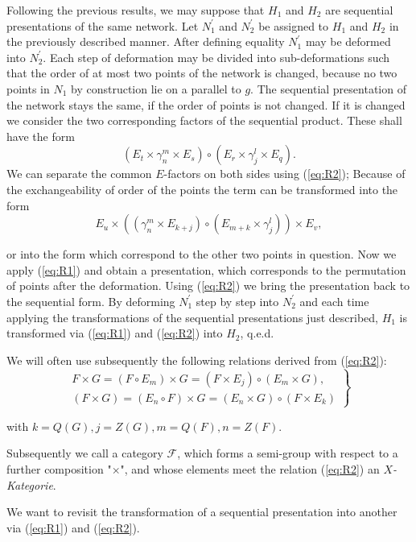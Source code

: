 \documentclass{article}
\begin{document}
Following the previous results, we may suppose that $H_1$ and $H_2$ are sequential presentations of the same network. Let $N_1^{\prime}$ and $N_2^{\prime}$ be assigned to $H_1$ and $H_2$ in the previously described manner. After defining equality $N_1^{\prime}$ may be deformed into $N_2^{\prime}$. Each step of deformation may be divided into sub-deformations such that the order of at most two points of the network is changed, because no two points in $N_1$ by construction lie on a parallel to $g$. The sequential
presentation of the network stays the same, if the order of points is not changed. If it is changed we consider the two corresponding factors of the sequential product. These shall have the form
\[
(E_t \times \gamma_n^m \times E_s) \circ (E_r \times \gamma_j^l \times E_q).
\]
We can separate the common $E$-factors on both sides using (\ref{eq:R2}); Because of the exchangeability of order of the points the term can be transformed into the form
\[
  E_u \times ((\gamma_n^m \times E_{k+j}) \circ (E_{m+k} \times \gamma_j^l)) \times E_v,
\]

or into the form which correspond to the other two points in question. Now we apply (\ref{eq:R1}) and obtain a presentation, which corresponds to the permutation of points after the deformation. Using (\ref{eq:R2}) we bring the presentation back to the sequential form. By deforming $N_1^{\prime}$ step by step into $N_2^{\prime}$ and each time applying the transformations of the sequential presentations just described, $H_1$ is transformed via (\ref{eq:R1}) and (\ref{eq:R2}) into $H_2$, q.e.d.

We will often use subsequently the following relations derived from (\ref{eq:R2}):
\begin{equation}
\label{eq:R2prime}
\tag{R2\'}
\left.
  \begin{array}{c}
  F \times G = (F \circ E_m) \times G = (F\times E_j) \circ (E_m \times G), \\
    (F \times G) = (E_n \circ F) \times G = (E_n \times G) \circ (F \times E_k)
\end{array}
\right\}
\end{equation}

with $k = Q(G), j = Z(G), m = Q(F), n = Z(F)$.

Subsequently we call a category $\mathcal{F}$, which forms a semi-group with respect to a further composition "$\times$", and whose elements meet the relation (\ref{eq:R2}) an \emph{$X$-Kategorie}. 

We want to revisit the transformation of a sequential presentation into another via (\ref{eq:R1}) and (\ref{eq:R2}).
\end{document}
